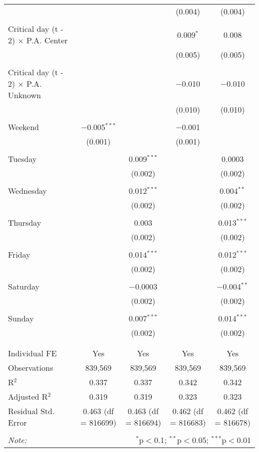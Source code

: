 \documentclass[
]{article}
\begin{document}
\begin{table}[!htbp]
{\begin{tabular}{@{\extracolsep{5pt}}lcccc}
  &  &  & (0.004) & (0.004) \\ 
  & & & & \\ 
 Critical day (t - 2) $\times$ P.A. Center &  &  & 0.009$^{*}$ & 0.008 \\ 
  &  &  & (0.005) & (0.005) \\ 
  & & & & \\ 
 Critical day (t - 2) $\times$ P.A. Unknown &  &  & $-$0.010 & $-$0.010 \\ 
  &  &  & (0.010) & (0.010) \\ 
  & & & & \\ 
 Weekend & $-$0.005$^{***}$ &  & $-$0.001 &  \\ 
  & (0.001) &  & (0.001) &  \\ 
  & & & & \\ 
 Tuesday &  & 0.009$^{***}$ &  & 0.0003 \\ 
  &  & (0.002) &  & (0.002) \\ 
  & & & & \\ 
 Wednesday &  & 0.012$^{***}$ &  & 0.004$^{**}$ \\ 
  &  & (0.002) &  & (0.002) \\ 
  & & & & \\ 
 Thursday &  & 0.003 &  & 0.013$^{***}$ \\ 
  &  & (0.002) &  & (0.002) \\ 
  & & & & \\ 
 Friday &  & 0.014$^{***}$ &  & 0.012$^{***}$ \\ 
  &  & (0.002) &  & (0.002) \\ 
  & & & & \\ 
 Saturday &  & $-$0.0003 &  & $-$0.004$^{**}$ \\ 
  &  & (0.002) &  & (0.002) \\ 
  & & & & \\ 
 Sunday &  & 0.007$^{***}$ &  & 0.014$^{***}$ \\ 
  &  & (0.002) &  & (0.002) \\ 
  & & & & \\ 
\hline \\[-1.8ex] 
Individual FE & Yes & Yes & Yes & Yes \\ 
Observations & 839,569 & 839,569 & 839,569 & 839,569 \\ 
R$^{2}$ & 0.337 & 0.337 & 0.342 & 0.342 \\ 
Adjusted R$^{2}$ & 0.319 & 0.319 & 0.323 & 0.323 \\ 
Residual Std. Error & 0.463 (df = 816699) & 0.463 (df = 816694) & 0.462 (df = 816683) & 0.462 (df = 816678) \\ 
\hline 
\hline \\[-1.8ex] 
\textit{Note:}  & \multicolumn{4}{r}{$^{*}$p$<$0.1; $^{**}$p$<$0.05; $^{***}$p$<$0.01} \\ 
\end{tabular}
} 
\end{table} 
\newpage
\end{document}
